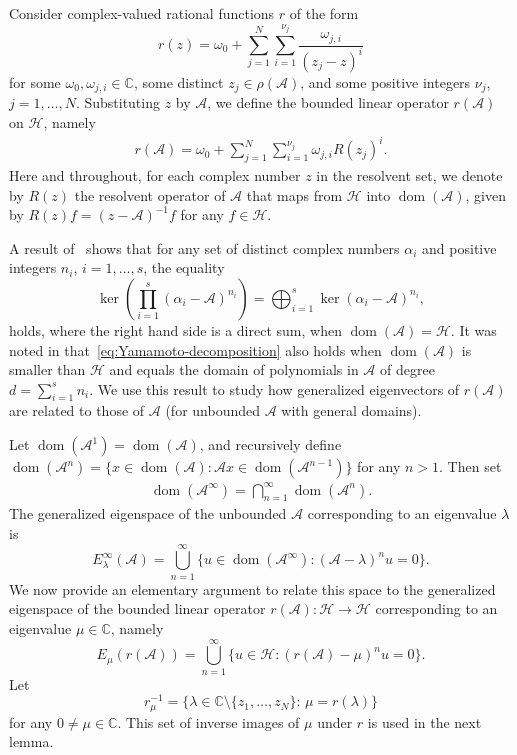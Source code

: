 \documentclass[12pt, oneside, reqno]{amsart}
\theoremstyle{remark}
\DeclareMathOperator{\dom}{dom}
\newcommand{\CC}{\mathbb{C}}
\newcommand{\nquad}{N}
\newcommand{\Ac}{\mathcal{A}}
\newcommand{\Hc}{\mathcal{H}}
\newcommand{\og}{\omega}
\begin{document}
Consider
complex-valued rational functions $r$ of the form
\begin{equation}
    r(z) =  \og_0 +  \sum_{j=1}^\nquad 
    \sum_{i=1}^{\nu_j}\frac{\omega_{j, i}}{(z_j - z)^i}
    \label{eq:feast-filter}
\end{equation}
for some $\og_0, \omega_{j,i} \in \CC$, some distinct $z_j \in
\rho(\Ac)$, and some positive integers $\nu_j$, $j=1,\dots,N$.
Substituting $z$ by $\Ac$, we define the bounded
linear operator $r(\Ac)$ on $\Hc$, namely
\begin{gather*}
  r(\Ac) =
  \og_0 +
  \sum_{j=1}^\nquad \sum_{i=1}^{\nu_j}\omega_{j, i} R(z_j)^i.
\end{gather*}
Here and throughout, for each complex number $z$ in the resolvent set, we denote
by $R(z)$ the resolvent operator of $\Ac$ that maps from $\Hc$ into $\dom(\Ac)$,
given by $R(z) f= (z - \Ac)^{-1}f$ for any $f \in \Hc$.


A result of~\cite{Yam1971-1} shows that for any set of distinct
complex numbers $\alpha_i$ and positive integers $n_i$, $i=1,\dots,s$,
the equality
\begin{equation}
  \label{eq:Yamamoto-decomposition}
    \ker \left( \prod_{i=1}^s (\alpha_i - \Ac)^{n_i} \right)
  = \bigoplus_{i=1}^s \ker ( \alpha_i - \Ac)^{n_i},
\end{equation}
holds, where the right hand side is a direct sum, when
$\dom (\Ac) = \Hc$. It was noted in \cite{GonzaOniev86}
that~\eqref{eq:Yamamoto-decomposition} also holds when $\dom (\Ac)$ is
smaller than $\Hc$ and equals the domain of polynomials in $\Ac$ of
degree $d= \sum_{i=1}^s n_i$. We use this result to study how
generalized eigenvectors of $r(\Ac)$ are related to those of $\Ac$
(for unbounded $\Ac$ with general domains).

Let $\dom(\Ac^1) = \dom(\Ac)$, and recursively define 
$\dom(\Ac^n ) = \{ x \in \dom (\Ac) : \Ac x \in \dom
(\Ac^{n-1})\}$ for any $n > 1$.
Then set
\begin{gather*}
  \dom (\Ac^\infty)= \bigcap_{n=1}^\infty \dom (\Ac^n).
\end{gather*}
The generalized eigenspace of the unbounded $\Ac$ corresponding to an 
eigenvalue $\lambda$ is
\[
  E_\lambda^\infty(\Ac) = \bigcup_{n=1}^\infty \{ u \in \dom (\Ac^\infty) :
  (\Ac-\lambda)^n u = 0   \}. 
\]
We now provide an elementary argument to  relate this space  to the generalized
eigenspace of the bounded
linear operator $r(\Ac): \Hc \to \Hc$ corresponding to an eigenvalue
$\mu \in \CC$, namely
\[
  E_\mu(r(\Ac)) =
  \bigcup_{n=1}^\infty \{ u \in \Hc: ( r(\Ac) -\mu )^n u = 0\}.
\]
Let
\begin{equation}
  \label{eq:r-mu-inv}
  r^{-1}_\mu = \{ \lambda \in \CC \setminus \{ z_1, \dots, z_N\}:  \,
  \mu = r(\lambda)\}  
\end{equation}
for any $0 \ne \mu \in \CC$.  This set of inverse images of $\mu$ under
$r$ is used in the next lemma.
\end{document}

